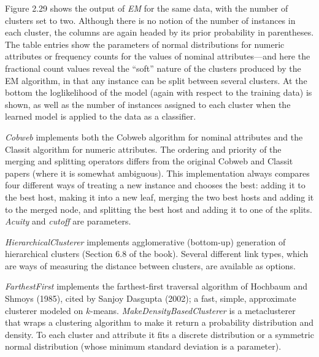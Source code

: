 Figure 2.29 shows the output of \textit{EM} for the same data, with
the number of clusters set to two. Although there is no notion of the
number of instances in each cluster, the columns are again headed by
its prior probability in parentheses. The table entries show the
parameters of normal distributions for numeric attributes or frequency
counts for the values of nominal attributes---and here the fractional
count values reveal the ``soft'' nature of the clusters produced by the
EM algorithm, in that any instance can be split between several
clusters. At the bottom the loglikelihood of the model (again with
respect to the training data) is shown, as well as the number of
instances assigned to each cluster when the learned model is applied
to the data as a classifier.

\textit{Cobweb} implements both the Cobweb algorithm for nominal
attributes and the Classit algorithm for numeric attributes. The
ordering and priority of the merging and splitting operators differs
from the original Cobweb and Classit papers (where it is somewhat
ambiguous). This implementation always compares four different ways of
treating a new instance and chooses the best: adding it to the best
host, making it into a new leaf, merging the two best hosts and adding
it to the merged node, and splitting the best host and adding it to
one of the splits. \textit{Acuity} and \textit{cutoff} are parameters.

\textit{HierarchicalClusterer} implements agglomerative (bottom-up)
generation of hierarchical clusters (Section 6.8 of the book). Several
different link types, which are ways of measuring the distance between
clusters, are available as options.

\textit{FarthestFirst} implements the farthest-first traversal
algorithm of Hochbaum and Shmoys (1985), cited by Sanjoy Dasgupta
(2002); a fast, simple, approximate clusterer modeled on
$k$-means. \textit{MakeDensityBasedClusterer} is a metaclusterer that
wraps a clustering algorithm to make it return a probability
distribution and density. To each cluster and attribute it fits a
discrete distribution or a symmetric normal distribution (whose
minimum standard deviation is a parameter).

